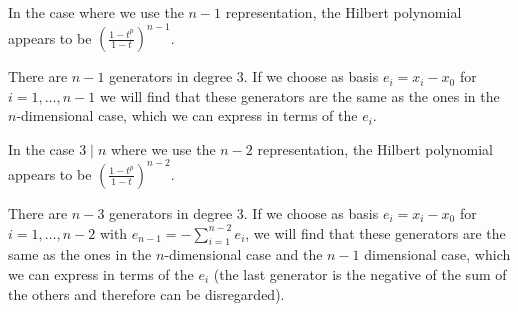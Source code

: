 \documentclass{article}
\numberwithin{equation}{section}
\begin{document}
In the case where we use the $n-1$ representation, the Hilbert polynomial appears to be $\left(\frac{1-t^p}{1-t}\right)^{n-1}$.

There are $n-1$ generators in degree $3$. If we choose as basis $e_i=x_i-x_0$ for $i=1,\dots,n-1$ we will find that these generators are the same as the ones in the $n$-dimensional case, which we can express in terms of the $e_i$. 

In the case $3 \mid n$ where we use the $n-2$ representation, the Hilbert polynomial appears to be $\left(\frac{1-t^p}{1-t}\right)^{n-2}$.

There are $n-3$ generators in degree $3$. If we choose as basis $e_i=x_i-x_0$ for $i=1,\dots,n-2$ with $e_{n-1}=-\sum_{i=1}^{n-2}e_i$, we will find that these generators are the same as the ones in the $n$-dimensional case and the $n-1$ dimensional case, which we can express in terms of the $e_i$ (the last generator is the negative of the sum of the others and therefore can be disregarded). 
\end{document}

